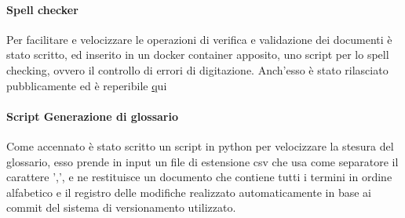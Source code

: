   \paragraph{Spell checker}
  Per facilitare e velocizzare le operazioni di verifica e validazione dei documenti è
  stato scritto, ed inserito in un docker container apposito, uno script per lo
  spell checking, ovvero il controllo di errori di digitazione.
  Anch'esso è stato rilasciato pubblicamente ed è reperibile \href{https://GitHub.com/Jatus93/spellCheck}qui

  \paragraph{Script Generazione di glossario}
  Come accennato è stato scritto un script in python per velocizzare la stesura
  del glossario, esso prende in input un file di estensione csv che usa come
  separatore il carattere ',', e ne restituisce un documento che contiene tutti i
  termini in ordine alfabetico e il registro delle modifiche realizzato automaticamente
  in base ai commit del sistema di versionamento utilizzato.
